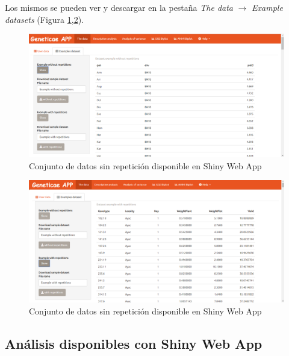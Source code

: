 Los mismos se pueden ver y descargar en la pestaña \emph{The data} $\rightarrow$ \emph{Example datasets} (Figura \ref{fig:fig41},\ref{fig:fig42}). 

\begin{figure}[h!]
	\begin{center}
		\includegraphics[width=17cm]{./Graficos/Exampledatasets_withoutrep.png}
	\end{center}
	\caption{Conjunto de datos sin repetición disponible en Shiny Web App}
	\label{fig:fig41}
\end{figure}


\begin{figure}[h!]
	\begin{center}
		\includegraphics[width=17cm]{./Graficos/Exampledatasets_withrep.png}
	\end{center}
	\caption{Conjunto de datos sin repetición disponible en Shiny Web App}
	\label{fig:fig42}
\end{figure}

\subsection{Análisis disponibles con Shiny Web App}


